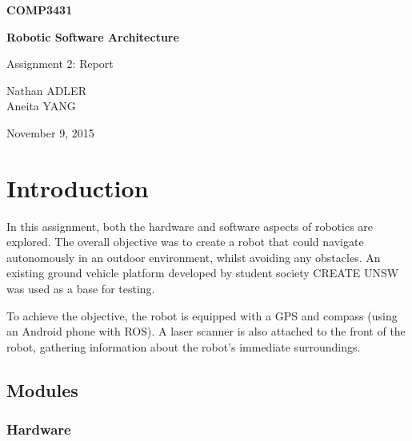 \documentclass[titlepage,12pt,a4paper]{article}
\begin{document}
\begin{titlepage}
    \begin{center}
        \vspace*{3cm}
        
        \Huge
        \textbf{COMP3431\\}
        \title{}
        \vspace{0.5cm}
        \Huge
        \textbf{Robotic Software Architecture}
        
        \vspace{0.54cm}
        
        \Large
        Assignment 2: Report
        
        \vspace{5cm}

	\large
	Nathan ADLER\\
	Aneita YANG\\

	\vfill
        
        \Large
        November 9, 2015
        
    \end{center}
\end{titlepage}

\pagebreak
\tableofcontents

\pagebreak
\section{Introduction}
In this assignment, both the hardware and software aspects of robotics are explored. The overall objective was to create a robot that could navigate autonomously in an outdoor environment, whilst avoiding any obstacles. An existing ground vehicle platform developed by student society CREATE UNSW was used as a base for testing.

To achieve the objective, the robot is equipped with a GPS and compass (using an Android phone with ROS). A laser scanner is also attached to the front of the robot, gathering information about the robot's immediate surroundings.

\subsection{Modules}

\subsubsection{Hardware}
\end{document}
